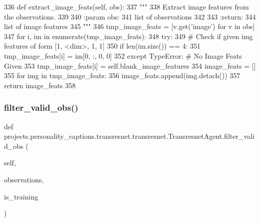 \begin{DoxyCode}
336     \textcolor{keyword}{def }extract\_image\_feats(self, obs):
337         \textcolor{stringliteral}{"""}
338 \textcolor{stringliteral}{        Extract image features from the observations.}
339 \textcolor{stringliteral}{}
340 \textcolor{stringliteral}{        :param obs:}
341 \textcolor{stringliteral}{            list of observations}
342 \textcolor{stringliteral}{}
343 \textcolor{stringliteral}{        :return:}
344 \textcolor{stringliteral}{            list of image features}
345 \textcolor{stringliteral}{        """}
346         tmp\_image\_feats = [v.get(\textcolor{stringliteral}{'image'}) \textcolor{keywordflow}{for} v \textcolor{keywordflow}{in} obs]
347         \textcolor{keywordflow}{for} i, im \textcolor{keywordflow}{in} enumerate(tmp\_image\_feats):
348             \textcolor{keywordflow}{try}:
349                 \textcolor{comment}{# Check if given img features of form [1, <dim>, 1, 1]}
350                 \textcolor{keywordflow}{if} len(im.size()) == 4:
351                     tmp\_image\_feats[i] = im[0, :, 0, 0]
352             \textcolor{keywordflow}{except} TypeError:  \textcolor{comment}{# No Image Feats Given}
353                 tmp\_image\_feats[i] = self.blank\_image\_features
354         image\_feats = []
355         \textcolor{keywordflow}{for} img \textcolor{keywordflow}{in} tmp\_image\_feats:
356             image\_feats.append(img.detach())
357         \textcolor{keywordflow}{return} image\_feats
358 
\end{DoxyCode}
\mbox{\label{classprojects_1_1personality__captions_1_1transresnet_1_1transresnet_1_1TransresnetAgent_aa3ad5410a6cb1ef7f730ba0fda5b673c}} 
\subsubsection{\texorpdfstring{filter\+\_\+valid\+\_\+obs()}{filter\_valid\_obs()}}
{\footnotesize\ttfamily def projects.\+personality\+\_\+captions.\+transresnet.\+transresnet.\+Transresnet\+Agent.\+filter\+\_\+valid\+\_\+obs (\begin{DoxyParamCaption}\item[{}]{self,  }\item[{}]{observations,  }\item[{}]{is\+\_\+training }\end{DoxyParamCaption})}


